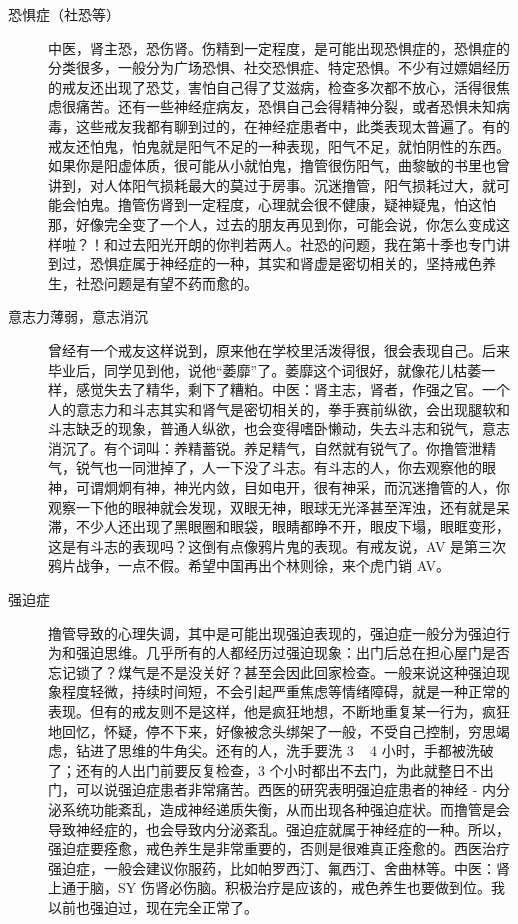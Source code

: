 \begin{description}
    \item[恐惧症（社恐等）] 中医，肾主恐，恐伤肾。伤精到一定程度，是可能出现恐惧症的，恐惧症的分类很多，一般分为广场恐惧、社交恐惧症、特定恐惧。不少有过嫖娼经历的戒友还出现了恐艾，害怕自己得了艾滋病，检查多次都不放心，活得很焦虑很痛苦。还有一些神经症病友，恐惧自己会得精神分裂，或者恐惧未知病毒，这些戒友我都有聊到过的，在神经症患者中，此类表现太普遍了。有的戒友还怕鬼，怕鬼就是阳气不足的一种表现，阳气不足，就怕阴性的东西。如果你是阳虚体质，很可能从小就怕鬼，撸管很伤阳气，曲黎敏的书里也曾讲到，对人体阳气损耗最大的莫过于房事。沉迷撸管，阳气损耗过大，就可能会怕鬼。撸管伤肾到一定程度，心理就会很不健康，疑神疑鬼，怕这怕那，好像完全变了一个人，过去的朋友再见到你，可能会说，你怎么变成这样啦？！和过去阳光开朗的你判若两人。社恐的问题，我在第十季也专门讲到过，恐惧症属于神经症的一种，其实和肾虚是密切相关的，坚持戒色养生，社恐问题是有望不药而愈的。
    \item[意志力薄弱，意志消沉] 曾经有一个戒友这样说到，原来他在学校里活泼得很，很会表现自己。后来毕业后，同学见到他，说他“萎靡”了。萎靡这个词很好，就像花儿枯萎一样，感觉失去了精华，剩下了糟粕。中医：肾主志，肾者，作强之官。一个人的意志力和斗志其实和肾气是密切相关的，拳手赛前纵欲，会出现腿软和斗志缺乏的现象，普通人纵欲，也会变得嗜卧懒动，失去斗志和锐气，意志消沉了。有个词叫：养精蓄锐。养足精气，自然就有锐气了。你撸管泄精气，锐气也一同泄掉了，人一下没了斗志。有斗志的人，你去观察他的眼神，可谓炯炯有神，神光内敛，目如电开，很有神采，而沉迷撸管的人，你观察一下他的眼神就会发现，双眼无神，眼球无光泽甚至浑浊，还有就是呆滞，不少人还出现了黑眼圈和眼袋，眼睛都睁不开，眼皮下塌，眼眶变形，这是有斗志的表现吗？这倒有点像鸦片鬼的表现。有戒友说，AV 是第三次鸦片战争，一点不假。希望中国再出个林则徐，来个虎门销 AV。
    \item[强迫症] 撸管导致的心理失调，其中是可能出现强迫表现的，强迫症一般分为强迫行为和强迫思维。几乎所有的人都经历过强迫现象：出门后总在担心屋门是否忘记锁了？煤气是不是没关好？甚至会因此回家检查。一般来说这种强迫现象程度轻微，持续时间短，不会引起严重焦虑等情绪障碍，就是一种正常的表现。但有的戒友则不是这样，他是疯狂地想，不断地重复某一行为，疯狂地回忆，怀疑，停不下来，好像被念头绑架了一般，不受自己控制，穷思竭虑，钻进了思维的牛角尖。还有的人，洗手要洗 3 ~ 4 小时，手都被洗破了；还有的人出门前要反复检查，3 个小时都出不去门，为此就整日不出门，可以说强迫症患者非常痛苦。西医的研究表明强迫症患者的神经 - 内分泌系统功能紊乱，造成神经递质失衡，从而出现各种强迫症状。而撸管是会导致神经症的，也会导致内分泌紊乱。强迫症就属于神经症的一种。所以，强迫症要痊愈，戒色养生是非常重要的，否则是很难真正痊愈的。西医治疗强迫症，一般会建议你服药，比如帕罗西汀、氟西汀、舍曲林等。中医：肾上通于脑，SY 伤肾必伤脑。积极治疗是应该的，戒色养生也要做到位。我以前也强迫过，现在完全正常了。


\end{description}
